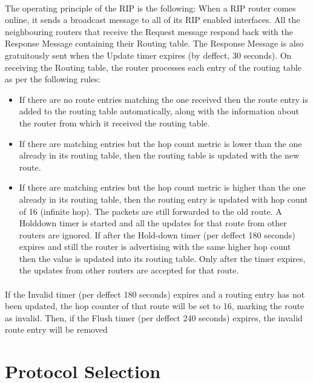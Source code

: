 \documentclass[12pt,a4paper]{report}
\begin{document}
\paragraph{}The operating principle of the RIP is the following: When a RIP router comes online, it sends a broadcast message to all of its RIP enabled interfaces. All the neighbouring routers that receive the Request message respond back with the Response Message containing their Routing table. The Response Message is also gratuitously sent when the Update timer expires (by deffect, 30 seconds). On receiving the Routing table, the router processes each entry of the routing table as per the following rules:
\begin{itemize}
	\item{} If there are no route entries matching the one received then the route entry is added to the routing table automatically, along with the information about the router from which it received the routing table.
	\item{} If there are matching entries but the hop count metric is lower than the one already in its routing table, then the routing table is updated with the new route.
	\item{} If there are matching entries but the hop count metric is higher than the one already in its routing table, then the routing entry is updated with hop count of 16 (infinite hop). The packets are still forwarded to the old route. A Holddown timer is started and all the updates for that route from other routers are ignored. If after the Hold-down timer (per deffect 180 seconds) expires and still the router is advertising with the same higher hop count then the value is updated into its routing table. Only after the timer expires, the updates from other routers are accepted for that route.
\end{itemize}
\paragraph{}If the Invalid timer (per deffect 180 seconds) expires and a routing entry has not been updated, the hop counter of that route will be set to 16, marking the route as invalid. Then, if the Flush timer (per deffect 240 seconds) expires, the invalid route entry will be removed

\section{Protocol Selection}
\end{document}
